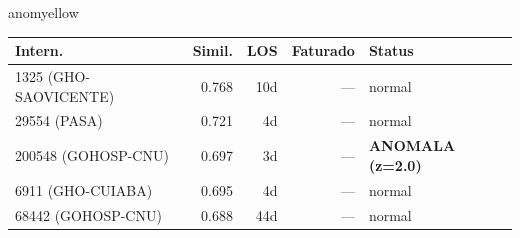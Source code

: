 \documentclass[a4paper,10pt]{article}
\begin{document}
\begin{anomalycard}[Internacao 166665 | GHO-PETROBRAS | MODERADO (z=2.26)]{anomyellow}
\begin{tabular}{l r r r l}\toprule\textbf{Intern.} & \textbf{Simil.} & \textbf{LOS} & \textbf{Faturado} & \textbf{Status} \\\midrule
1325 (GHO-SAOVICENTE) & 0.768 & 10d & --- & \textcolor{jcubeblue}{normal} \\
29554 (PASA) & 0.721 & 4d & --- & \textcolor{jcubeblue}{normal} \\
200548 (GOHOSP-CNU) & 0.697 & 3d & --- & \textcolor{anomred}{\textbf{ANOMALA (z=2.0)}} \\
6911 (GHO-CUIABA) & 0.695 & 4d & --- & \textcolor{jcubeblue}{normal} \\
68442 (GOHOSP-CNU) & 0.688 & 44d & --- & \textcolor{jcubeblue}{normal} \\
\bottomrule\end{tabular}


\end{anomalycard}

\newpage
\end{document}
